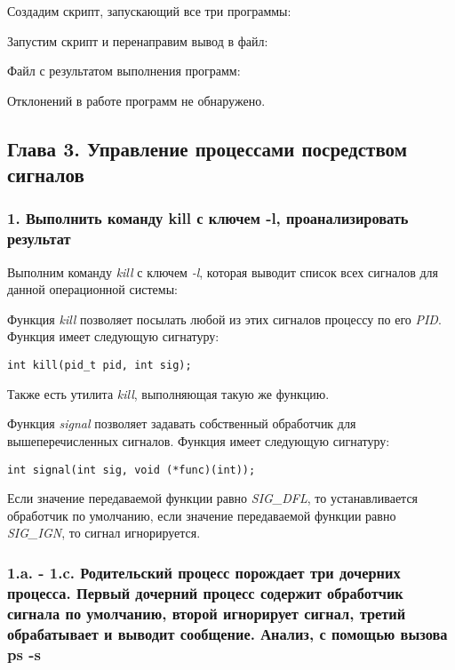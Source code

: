 \documentclass[14pt,a4paper,report]{report}
\begin{document}
Создадим скрипт, запускающий все три программы:



Запустим скрипт и перенаправим вывод в файл:



Файл с результатом выполнения программ:



Отклонений в работе программ не обнаружено.

\subsection{Глава 3. Управление процессами посредством сигналов}

\subsubsection{1. Выполнить команду kill с ключем -l, проанализировать результат}

Выполним команду \emph{kill} с ключем \emph{-l}, которая выводит список всех сигналов для данной операционной системы:



Функция \emph{kill} позволяет посылать любой из этих сигналов процессу по его \emph{PID}. Функция имеет следующую сигнатуру:

\begin{verbatim}
int kill(pid_t pid, int sig);
\end{verbatim}

Также есть утилита \emph{kill}, выполняющая такую же функцию.

Функция \emph{signal} позволяет задавать собственный обработчик для вышеперечисленных сигналов. Функция имеет следующую сигнатуру:

\begin{verbatim}
int signal(int sig, void (*func)(int));
\end{verbatim}

Если значение передаваемой функции равно \emph{SIG\_DFL}, то устанавливается обработчик по умолчанию, если значение передаваемой функции равно \emph{SIG\_IGN}, то сигнал игнорируется.

\subsubsection{1.a. - 1.c. Родительский процесс порождает  три дочерних процесса. Первый дочерний процесс содержит обработчик сигнала по умолчанию, второй игнорирует сигнал, третий обрабатывает и выводит сообщение. Анализ, с помощью вызова ps -s}
\end{document}
